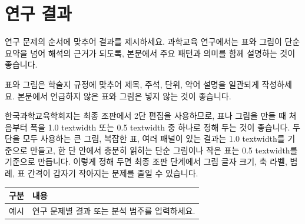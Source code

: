 \section{연구 결과}

연구 문제의 순서에 맞추어 결과를 제시하세요. 과학교육 연구에서는 표와 그림이 단순 요약을 넘어 해석의 근거가 되도록, 본문에서 주요 패턴과 의미를 함께 설명하는 것이 좋습니다.

표와 그림은 학술지 규정에 맞추어 제목, 주석, 단위, 약어 설명을 일관되게 작성하세요. 본문에서 언급하지 않은 표와 그림은 넣지 않는 것이 좋습니다.

한국과학교육학회지는 최종 조판에서 2단 편집을 사용하므로, 표나 그림을 만들 때 처음부터 폭을 1.0 textwidth 또는 0.5 textwidth 중 하나로 정해 두는 것이 좋습니다. 두 단을 모두 사용하는 큰 그림, 복잡한 표, 여러 패널이 있는 결과는 1.0 textwidth를 기준으로 만들고, 한 단 안에서 충분히 읽히는 단순 그림이나 작은 표는 0.5 textwidth를 기준으로 만듭니다. 이렇게 정해 두면 최종 조판 단계에서 그림 글자 크기, 축 라벨, 범례, 표 간격이 갑자기 작아지는 문제를 줄일 수 있습니다.

\begin{ManuscriptWideTable}
\caption{한국과학교육학회지 원고용 표 예시}
\label{tab:example}
\centering
\begin{tabular}{ll}
\toprule
구분 & 내용 \\
\midrule
예시 & 연구 문제별 결과 또는 분석 범주를 입력하세요. \\
\bottomrule
\end{tabular}
\end{ManuscriptWideTable}
